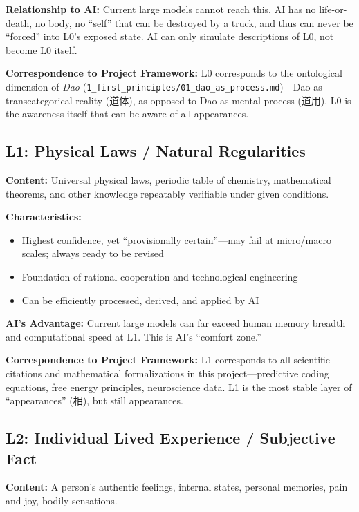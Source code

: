 \documentclass[11pt,a4paper]{article}
\begin{document}
\textbf{Relationship to AI:} Current large models cannot reach this. AI has no life-or-death, no body, no ``self'' that can be destroyed by a truck, and thus can never be ``forced'' into L0's exposed state. AI can only simulate descriptions of L0, not become L0 itself.

\textbf{Correspondence to Project Framework:} L0 corresponds to the ontological dimension of \textit{Dao} (\texttt{1\_first\_principles/01\_dao\_as\_process.md})---Dao as transcategorical reality (道体), as opposed to Dao as mental process (道用). L0 is the awareness itself that can be aware of all appearances.

\subsection{L1: Physical Laws / Natural Regularities}

\textbf{Content:} Universal physical laws, periodic table of chemistry, mathematical theorems, and other knowledge repeatably verifiable under given conditions.

\textbf{Characteristics:}
\begin{itemize}[nosep]
    \item Highest confidence, yet ``provisionally certain''---may fail at micro/macro scales; always ready to be revised
    \item Foundation of rational cooperation and technological engineering
    \item Can be efficiently processed, derived, and applied by AI
\end{itemize}

\textbf{AI's Advantage:} Current large models can far exceed human memory breadth and computational speed at L1. This is AI's ``comfort zone.''

\textbf{Correspondence to Project Framework:} L1 corresponds to all scientific citations and mathematical formalizations in this project---predictive coding equations, free energy principles, neuroscience data. L1 is the most stable layer of ``appearances'' (相), but still appearances.

\subsection{L2: Individual Lived Experience / Subjective Fact}

\textbf{Content:} A person's authentic feelings, internal states, personal memories, pain and joy, bodily sensations.
\end{document}
